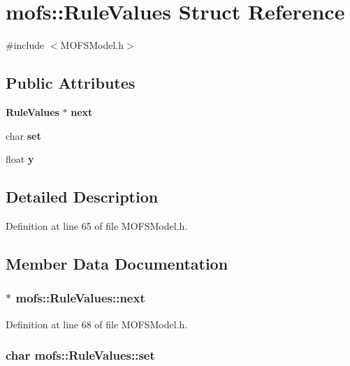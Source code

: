\section{mofs\-:\-:Rule\-Values Struct Reference}
\label{structmofs_1_1RuleValues}


{\ttfamily \#include $<$M\-O\-F\-S\-Model.\-h$>$}

\subsection*{Public Attributes}
\begin{DoxyCompactItemize}
\item 
{\bf Rule\-Values} $\ast$ {\bf next}
\item 
char {\bf set}
\item 
float {\bf y}
\end{DoxyCompactItemize}


\subsection{Detailed Description}


Definition at line 65 of file M\-O\-F\-S\-Model.\-h.



\subsection{Member Data Documentation}
\subsubsection[{next}]{$\ast$ mofs\-::\-Rule\-Values\-::next}\label{structmofs_1_1RuleValues_adc7b0b97d20b09db33de157840a80430}


Definition at line 68 of file M\-O\-F\-S\-Model.\-h.

\subsubsection[{set}]{\setlength{\rightskip}{0pt plus 5cm}char mofs\-::\-Rule\-Values\-::set}\label{structmofs_1_1RuleValues_ad6ab1d226cf2fff1902a5e871cbfa044}


